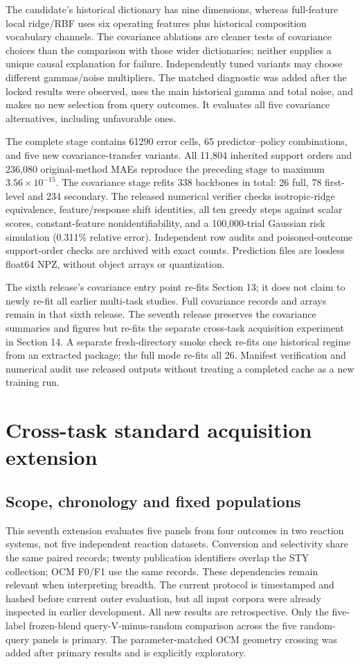 \documentclass[11pt]{article}
\begin{document}
The candidate's historical dictionary has nine dimensions, whereas full-feature local ridge/RBF uses six operating features plus historical composition vocabulary channels. The covariance ablations are cleaner tests of covariance choices than the comparison with those wider dictionaries; neither supplies a unique causal explanation for failure. Independently tuned variants may choose different gammas/noise multipliers. The matched diagnostic was added after the locked results were observed, uses the main historical gamma and total noise, and makes no new selection from query outcomes. It evaluates all five covariance alternatives, including unfavorable ones.

The complete stage contains 61290 error cells, 65 predictor--policy combinations, and five new covariance-transfer variants. All 11,804 inherited support orders and 236,080 original-method MAEs reproduce the preceding stage to maximum $3.56\times10^{-15}$. The covariance stage refits 338 backbones in total: 26 full, 78 first-level and 234 secondary. The released numerical verifier checks isotropic-ridge equivalence, feature/response shift identities, all ten greedy steps against scalar scores, constant-feature nonidentifiability, and a 100,000-trial Gaussian risk simulation (0.311\% relative error). Independent row audits and poisoned-outcome support-order checks are archived with exact counts. Prediction files are lossless float64 NPZ, without object arrays or quantization.

The sixth release's covariance entry point re-fits Section 13; it does not claim to newly re-fit all earlier multi-task studies. Full covariance records and arrays remain in that sixth release. The seventh release preserves the covariance summaries and figures but re-fits the separate cross-task acquisition experiment in Section 14. A separate fresh-directory smoke check re-fits one historical regime from an extracted package; the full mode re-fits all 26. Manifest verification and numerical audit use released outputs without treating a completed cache as a new training run.

\section{Cross-task standard acquisition extension}
\subsection{Scope, chronology and fixed populations}
This seventh extension evaluates five panels from four outcomes in two reaction systems, not five independent reaction datasets. Conversion and selectivity share the same paired records; twenty publication identifiers overlap the STY collection; OCM F0/F1 use the same records. These dependencies remain relevant when interpreting breadth. The current protocol is timestamped and hashed before current outer evaluation, but all input corpora were already inspected in earlier development. All new results are retrospective. Only the five-label frozen-blend query-V-minus-random comparison across the five random-query panels is primary. The parameter-matched OCM geometry crossing was added after primary results and is explicitly exploratory.
\end{document}
